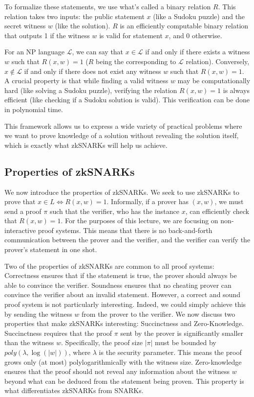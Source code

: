 To formalize these statements, we use what's called a binary relation $R$. This relation takes two inputs: the public statement $x$ (like a Sudoku puzzle) and the secret witness $w$ (like the solution). $R$ is an efficiently computable binary relation that outputs 1 if the witness $w$ is valid for statement $x$, and 0 otherwise.

For an NP language $\mathcal{L}$, we can say that $x \in \mathcal{L}$ if and only if there exists a witness $w$ such that $R(x, w) = 1$ ($R$ being the corresponding to $\mathcal{L}$ relation). Conversely, $x \notin \mathcal{L}$ if and only if there does not exist any witness $w$ such that $R(x, w) = 1$. A crucial property is that while finding a valid witness $w$ may be computationally hard (like solving a Sudoku puzzle), verifying the relation $R(x,w)=1$ is always efficient (like checking if a Sudoku solution is valid). This verification can be done in polynomial time.

This framework allows us to express a wide variety of practical problems where we want to prove knowledge of a solution without revealing the solution itself, which is exactly what zkSNARKs will help us achieve.

\subsection{Properties of zkSNARKs}

We now introduce the properties of zkSNARKs. We seek to use zkSNARKs to prove that $x \in L \iff R(x, w) = 1$. Informally, if a prover has $(x, w)$, we must send a proof $\pi$ such that the verifier, who has the instance $x$, can efficiently check that $R(x, w) = 1$. For the purposes of this lecture, we are focusing on non-interactive proof systems. This means that there is no back-and-forth communication between the prover and the verifier, and the verifier can verify the prover's statement in one shot.

Two of the properties of zkSNARKs are common to all proof systems: Correctness ensures that if the statement is true, the prover should always be able to convince the verifier. Soundness ensures that no cheating prover can convince the verifier about an invalid statement. However, a correct and sound proof system is not particularly interesting. Indeed, we could simply achieve this by sending the witness $w$ from the prover to the verifier. We now discuss two properties that make zkSNARKs interesting: Succinctness and Zero-Knowledge. Succinctness requires that the proof $\pi$ sent by the prover is significantly smaller than the witness $w$. Specifically, the proof size $|\pi|$ must be bounded by $poly(\lambda, \log(|w|))$, where $\lambda$ is the security parameter. This means the proof grows only (at most) polylogarithmically with the witness size. Zero-knowledge ensures that the proof should not reveal any information about the witness $w$ beyond what can be deduced from the statement being proven. This property is what differentiates zkSNARKs from SNARKs.

